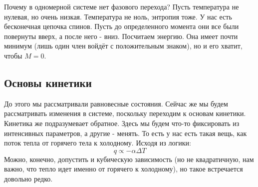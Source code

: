 \documentclass[a4paper, 12pt]{article}
\begin{document}
	Почему в одномерной системе нет фазового перехода? Пусть температура не нулевая, но очень низкая. Температура не ноль, энтропия тоже. У нас есть бесконечная цепочка спинов. Пусть до определенного момента они все были повернуты вверх, а после него - вниз. Посчитаем энергию. Она имеет почти минимум (лишь один член войдёт с положительным знаком), но и его хватит, чтобы $M = 0$.
	\subsection{Основы кинетики}
	До этого мы рассматривали равновесные состояния. Сейчас же мы будем рассматривать изменения в системе, поскольку переходим к основам кинетики.	Кинетика же подразумевает обратное. Здесь мы будем что-то фиксировать из интенсивных параметров, а другие - менять. То есть у нас есть такая вещь, как поток тепла от горячего тела к холодному. Исходя из логики:
	\begin{equation*}
		q \propto - \alpha \Delta T
	\end{equation*}
	Можно, конечно, допустить и кубическую зависимость (но не квадратичную, нам важно, что тепло идет именно от горячего к холодному), но такое встречается довольно редко.
\end{document}
